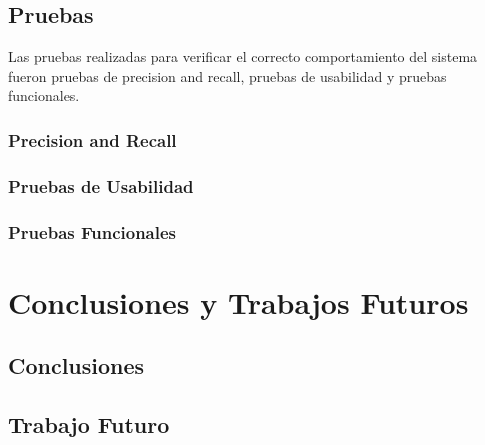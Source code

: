 \documentclass[12pt,letterpaper,openany]{book}
\begin{document}
\section{Pruebas}
Las pruebas realizadas para verificar el correcto comportamiento del sistema fueron pruebas de precision and recall, pruebas de usabilidad y pruebas funcionales.

\subsection{Precision and Recall}
\subsection{Pruebas de Usabilidad}
\subsection{Pruebas Funcionales }


\chapter{Conclusiones y Trabajos Futuros}\label{cap.conclu_trabajos}
\section{Conclusiones}
\section{Trabajo Futuro}

\end{document}
